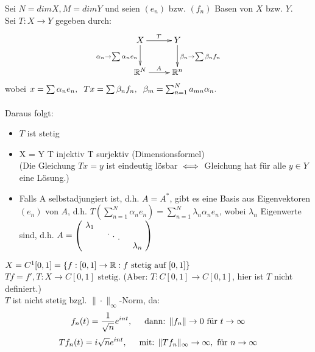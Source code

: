 Sei $N = dim X, M = dim Y$ und seien $(e_n)$ bzw. $(f_n)$ Basen von $X$ bzw. $Y$. 	\\
Sei $T : X \rightarrow Y$ gegeben durch: \\
\[ \begin{xy} \xymatrix{
	X \ar[r]^T	\ar[d]_{ \alpha_{n} \rightarrow \sum \alpha_{n} e_{n} }  &   Y \ar[d]^{ \beta_{n} \rightarrow \sum \beta_{n} f_{n} }  \\
      	\MdR^{N} 	\ar[r]^A    				&   \MdR^{n}  				
} \end{xy} \]
wobei $x = \sum \alpha_{n} e_{n},\hspace{0.2cm} Tx = \sum \beta_n f_n, \hspace{0.2cm} \beta_m = \sum_{n = 1}^{N} a_{mn} \alpha_{n}. $ \\ \\
Daraus folgt:
\begin{itemize}
	\item $T$ ist stetig
	\item X = Y \gdw T injektiv \gdw T surjektiv (Dimensionsformel) \\
	(Die Gleichung $Tx = y$ ist eindeutig lösbar $\iff$ Gleichung hat für alle $y \in Y$ eine Lösung.)
	\item Falls A selbstadjungiert ist, d.h. $A = A^{*}$, gibt es eine Basis aus Eigenvektoren $(e_{n})$ von $A$, d.h. $ T( \sum_{n=1}^{N} \alpha_{n} e_{n} ) = \sum_{n=1}^{N} \lambda_{n} \alpha_{n} e_{n}$, wobei $\lambda_{n}$ Eigenwerte sind, d.h. $A =
			\begin{pmatrix}
				\diagentry{\lambda_{1}}\\
				&\diagentry{\xddots}\\
				&&\diagentry{\lambda_{n}}\\
			\end{pmatrix} $
\end{itemize}


\begin{beispiel}
$X = C^{1}[0, 1] = \{ f : [0, 1] \rightarrow \mathbb{R}: f \text{ stetig auf } [0, 1] \}$ \\
$T f = f', T : X \rightarrow C[0, 1] \text{ stetig.} $ (Aber: $T: C[0, 1] \rightarrow C[0, 1]$, hier ist $T$ nicht definiert.) \\

$T$ ist nicht stetig bzgl. $\| \cdot \|_{\infty}$-Norm, da:
\[ f_{n}(t) = \frac{1}{\sqrt{n}}e^{int}, \hspace{0.5cm}  \text{dann: } \|f_{n}\| \rightarrow 0 \text{ für } t \rightarrow \infty \]	
\[ T f_{n}(t) = i \sqrt{n} e^{int}, \hspace{0.5cm} \text{mit: } \| T f_{n} \|_{\infty} \rightarrow \infty, \text{ für } n \rightarrow \infty \]
\end{beispiel}


